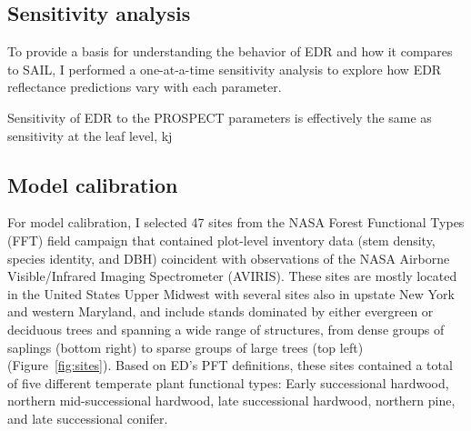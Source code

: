 \subsection{Sensitivity analysis}

To provide a basis for understanding the behavior of EDR and how it compares to SAIL,
I performed a one-at-a-time sensitivity analysis to explore how EDR reflectance predictions vary with each parameter. 

Sensitivity of EDR to the PROSPECT parameters is effectively the same as sensitivity at the leaf level, kj

\subsection{Model calibration}

For model calibration, I selected 47 sites from the NASA Forest Functional Types (FFT) field campaign that contained plot-level inventory data (stem density, species identity, and DBH) coincident with observations of the NASA Airborne Visible/Infrared Imaging Spectrometer (AVIRIS).
These sites are mostly located in the United States Upper Midwest with several sites also in upstate New York and western Maryland, and include stands dominated by either evergreen or deciduous trees and spanning a wide range of structures, from dense groups of saplings (bottom right) to sparse groups of large trees (top left) (Figure~\ref{fig:sites}).
Based on ED's PFT definitions, these sites contained a total of five different temperate plant functional types: Early successional hardwood, northern mid-successional hardwood, late successional hardwood, northern pine, and late successional conifer.

